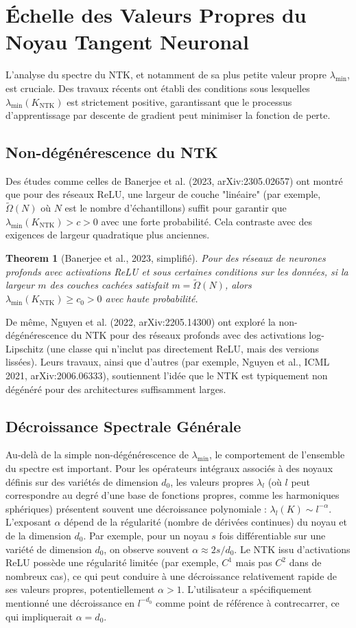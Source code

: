 \documentclass{article}
\newtheorem{theorem}{Theorem}[section]
\newcommand{\KNTK}{K_{\text{NTK}}}
\newcommand{\lambdaMin}{\lambda_{\min}}
\newcommand{\TildeOmega}{\tilde{\Omega}}
\begin{document}
\section{Échelle des Valeurs Propres du Noyau Tangent Neuronal}

L'analyse du spectre du NTK, et notamment de sa plus petite valeur propre $\lambdaMin$, est cruciale. Des travaux récents ont établi des conditions sous lesquelles $\lambdaMin(\KNTK)$ est strictement positive, garantissant que le processus d'apprentissage par descente de gradient peut minimiser la fonction de perte.

\subsection{Non-dégénérescence du NTK}
Des études comme celles de Banerjee et al. (2023, arXiv:2305.02657) ont montré que pour des réseaux ReLU, une largeur de couche "linéaire" (par exemple, $\TildeOmega(N)$ où $N$ est le nombre d'échantillons) suffit pour garantir que $\lambdaMin(\KNTK) > c > 0$ avec une forte probabilité. Cela contraste avec des exigences de largeur quadratique plus anciennes.
\begin{theorem}[Banerjee et al., 2023, simplifié]
Pour des réseaux de neurones profonds avec activations ReLU et sous certaines conditions sur les données, si la largeur $m$ des couches cachées satisfait $m = \TildeOmega(N)$, alors $\lambdaMin(\KNTK) \geq c_0 > 0$ avec haute probabilité.
\end{theorem}
De même, Nguyen et al. (2022, arXiv:2205.14300) ont exploré la non-dégénérescence du NTK pour des réseaux profonds avec des activations log-Lipschitz (une classe qui n'inclut pas directement ReLU, mais des versions lissées). Leurs travaux, ainsi que d'autres (par exemple, Nguyen et al., ICML 2021, arXiv:2006.06333), soutiennent l'idée que le NTK est typiquement non dégénéré pour des architectures suffisamment larges.

\subsection{Décroissance Spectrale Générale}
Au-delà de la simple non-dégénérescence de $\lambdaMin$, le comportement de l'ensemble du spectre est important. Pour les opérateurs intégraux associés à des noyaux définis sur des variétés de dimension $d_0$, les valeurs propres $\lambda_l$ (où $l$ peut correspondre au degré d'une base de fonctions propres, comme les harmoniques sphériques) présentent souvent une décroissance polynomiale : $\lambda_l(K) \sim l^{-\alpha}$. L'exposant $\alpha$ dépend de la régularité (nombre de dérivées continues) du noyau et de la dimension $d_0$. Par exemple, pour un noyau $s$ fois différentiable sur une variété de dimension $d_0$, on observe souvent $\alpha \approx 2s/d_0$. Le NTK issu d'activations ReLU possède une régularité limitée (par exemple, $C^1$ mais pas $C^2$ dans de nombreux cas), ce qui peut conduire à une décroissance relativement rapide de ses valeurs propres, potentiellement $\alpha > 1$. L'utilisateur a spécifiquement mentionné une décroissance en $l^{-d_0}$ comme point de référence à contrecarrer, ce qui impliquerait $\alpha = d_0$.
\end{document}
